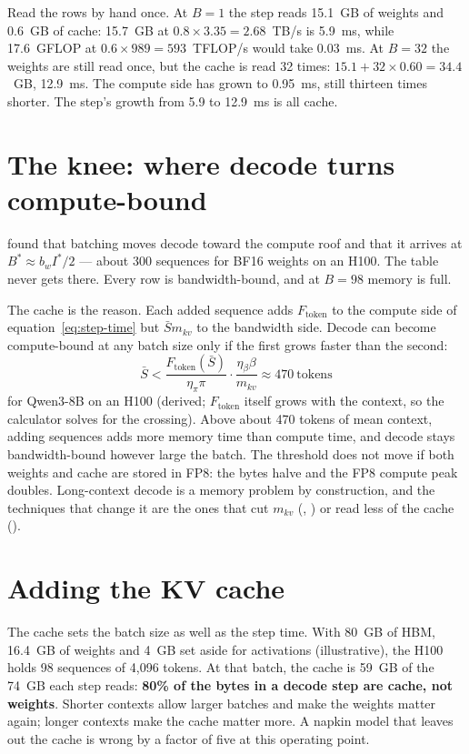 Read the rows by hand once. At $B = 1$ the step reads 15.1~GB of weights and
0.6~GB of cache: 15.7~GB at $0.8 \times 3.35 = 2.68$~TB/s is 5.9~ms, while
17.6~GFLOP at $0.6 \times 989 = 593$~TFLOP/s would take 0.03~ms. At $B = 32$
the weights are still read once, but the cache is read 32 times: $15.1 + 32
\times 0.60 = 34.4$~GB, 12.9~ms. The compute side has grown to 0.95~ms, still
thirteen times shorter. The step's growth from 5.9 to 12.9~ms is all cache.

\section{The knee: where decode turns compute-bound}

 found that batching moves decode toward the compute roof and
that it arrives at $B^{*}\approx b_wI^{*}/2$ --- about 300 sequences for BF16
weights on an H100. The table never gets there. Every row is bandwidth-bound,
and at $B=98$ memory is full.

The cache is the reason. Each added sequence adds $F_{\text{token}}$ to the
compute side of equation~\eqref{eq:step-time} but $\bar{S}m_{kv}$ to the
bandwidth side. Decode can become compute-bound at any batch size only if the
first grows faster than the second:
\begin{equation}
\bar{S} < \frac{F_{\text{token}}(\bar{S})}{\eta_\pi\pi}\cdot\frac{\eta_\beta\beta}{m_{kv}}
\approx 470\ \text{tokens}
\label{eq:knee-context}
\end{equation}
for Qwen3-8B on an H100 (derived; $F_{\text{token}}$ itself grows with the
context, so the calculator solves for the crossing). Above about 470 tokens of
mean context, adding sequences adds more memory time than compute time, and
decode stays bandwidth-bound however large the batch. The threshold does not
move if both weights and cache are stored in FP8: the bytes halve and the FP8
compute peak doubles. Long-context decode is a memory problem by construction,
and the techniques that change it are the ones that cut $m_{kv}$
(, ) or read less of the cache
().

\section{Adding the KV cache}

The cache sets the batch size as well as the step time. With 80~GB of HBM,
16.4~GB of weights and 4~GB set aside for activations (illustrative), the H100
holds 98 sequences of 4,096 tokens. At that batch, the cache is 59~GB of the
74~GB each step reads: \textbf{80\% of the bytes in a decode step are cache,
not weights}. Shorter contexts allow larger batches and make the weights
matter again; longer contexts make the cache matter more. A napkin model that
leaves out the cache is wrong by a factor of five at this operating point.

